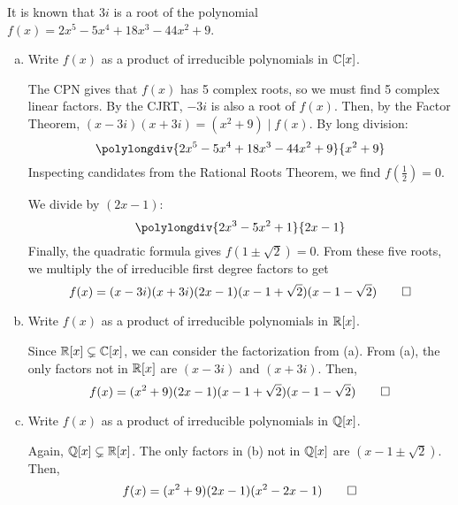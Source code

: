 \documentclass{agony}
\begin{document}
\begin{prob}
  It is known that $3i$ is a root of the polynomial $f(x) = 2x^5 - 5x^4 + 18x^3 - 44x^2 + 9$.
  \begin{enumerate}[(a)]
    \item Write $f(x)$ as a product of irreducible polynomials in $\mathbb{C}[x]$.
          \begin{sol}
            The CPN gives that $f(x)$ has 5 complex roots, so we must find 5 complex linear factors.
            By the CJRT, $-3i$ is also a root of $f(x)$.
            Then, by the Factor Theorem, $(x-3i)(x+3i) = (x^2+9) \mid f(x)$.
            By long division: \[ \polylongdiv{2x^5 - 5x^4 + 18x^3 - 44x^2 + 9}{x^2 + 9} \]
            Inspecting candidates from the Rational Roots Theorem, we find $f(\frac12) = 0$.
            
            We divide by $(2x-1)$:
            \[ \polylongdiv{2x^3 - 5x^2 + 1}{2x-1} \]
            Finally, the quadratic formula gives $f(1\pm\sqrt{2}) = 0$.
            From these five roots, we multiply the of irreducible first degree factors to get
            \[ f(x) = (x-3i)(x+3i)(2x-1)(x-1+\sqrt{2})(x-1-\sqrt{2}) \qedhere \]
          \end{sol}
    \item Write $f(x)$ as a product of irreducible polynomials in $\mathbb{R}[x]$.
          \begin{sol}
            Since $\mathbb{R}[x] \subsetneq \mathbb{C}[x]$, we can consider the factorization from (a).
            From (a), the only factors not in $\mathbb{R}[x]$ are $(x-3i)$ and $(x+3i)$. Then,
            \[ f(x) = (x^2+9)(2x-1)(x-1+\sqrt{2})(x-1-\sqrt{2}) \qedhere \]
          \end{sol}
    \item Write $f(x)$ as a product of irreducible polynomials in $\mathbb{Q}[x]$.
          \begin{sol}
            Again, $\mathbb{Q}[x] \subsetneq \mathbb{R}[x]$.
            The only factors in (b) not in $\mathbb{Q}[x]$ are $(x-1\pm\sqrt{2})$. Then,
            \[ f(x) = (x^2+9)(2x-1)(x^2-2x-1) \qedhere \]
          \end{sol}
  \end{enumerate}
\end{prob}
\end{document}
